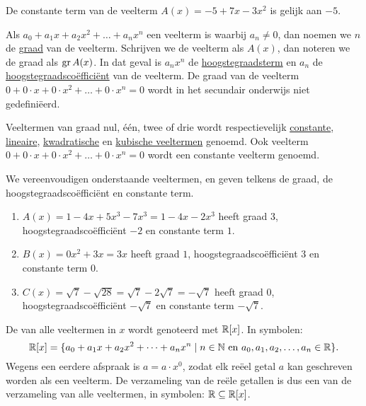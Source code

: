 \documentclass{ximera}
\begin{document}
\begin{example}
De constante term van de veelterm $A(x) = -5 + 7x - 3x^2$ is gelijk aan $-5$.  
\end{example}

Als $a_0 + a_1x + a_2x^2 + \dots + a_n x^n$ een veelterm is waarbij $a_n \neq 0$, dan noemen we $n$ de \underline{graad} van de veelterm. Schrijven we de veelterm als $A(x)$, dan noteren we de graad als $\operatorname{gr} A(x)$. In dat geval is $a_nx^n$ de \underline{hoogstegraadsterm} en $a_n$ de \underline{hoogstegraadsco\"effici\"ent} van de veelterm. De graad van de veelterm $0 + 0\cdot x + 0 \cdot x^2 + \dots + 0\cdot x^n = 0$ wordt in het secundair onderwijs niet gedefini\"eerd.

Veeltermen van graad nul, \'e\'en, twee of drie wordt respectievelijk \underline{constante}, \underline{lineaire}, \linebreak \underline{kwadratische} en \underline{kubische veeltermen} genoemd. Ook veelterm $0 + 0\cdot x + 0 \cdot x^2 + \dots + 0\cdot x^n = 0$ wordt een constante veelterm genoemd.

\begin{example}
We vereenvoudigen onderstaande veeltermen, en geven telkens de graad, de hoogstegraadsco\"effici\"ent en constante term.
\begin{enumerate}

\item
$A(x) = 1-4x+5x^3-7x^3 = 1 - 4x - 2x^3$ heeft graad $3$, hoogstegraadsco\"effici\"ent $-2$ en constante term $1$.
\item
$B(x) = 0x^2 + 3x = 3x$ heeft graad $1$, hoogstegraadsco\"effici\"ent $3$ en constante term $0$.
\item
$C(x) = \sqrt{7}-\sqrt{28} = \sqrt{7}-2\sqrt{7} = -\sqrt{7}$ heeft graad $0$, hoogstegraadsco\"effici\"ent $-\sqrt{7}$ en constante term $-\sqrt{7}$.
\end{enumerate}
\end{example}

De  van alle veeltermen in $x$ wordt genoteerd met $\mathbb{R}[x]$. In symbolen:
\[
\mathbb{R}[x] = \{a_0 + a_1 x + a_2 x^2 + \dots + a_n x^n \mid \text{$n \in \mathbb{N}$ en $a_0,a_1,a_2,\ldots,a_n \in \mathbb{R}$} \}.
\]
Wegens een eerdere afspraak is $a = a\cdot x^0$, zodat elk re\"eel getal $a$ kan geschreven worden als een veelterm. De verzameling van de re\"ele getallen is dus een 
van de verzameling van alle veeltermen, in symbolen: $\mathbb{R} \subseteq \mathbb{R}[x]$. 
\end{document}
